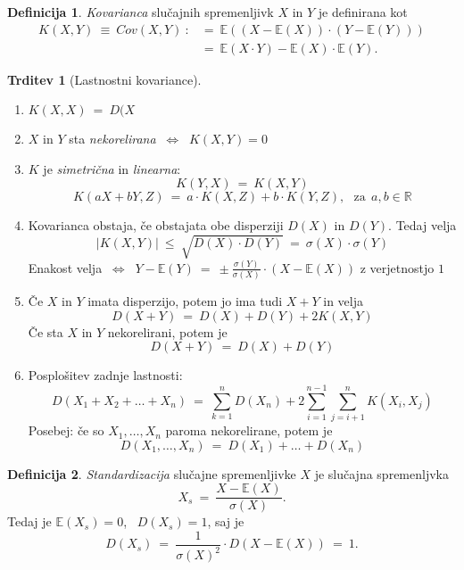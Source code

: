 \documentclass[11pt]{article}
\theoremstyle{definition}
\newtheorem{definicija}{Definicija}[section]
\theoremstyle{definition}
\newtheorem{trditev}{Trditev}[section]
\theoremstyle{definition}
\begin{document}
\vspace{0.5cm}

\begin{definicija}

\textit{Kovarianca} slučajnih spremenljivk $X$ in $Y$ je definirana kot 
\begin{align*}
K(X, Y) ~\equiv~ Cov(X, Y) ~:&=~ \mathbb{E}((X - \mathbb{E}(X)) \cdot (Y - \mathbb{E}(Y))) \\
&=~ \mathbb{E}(X \cdot Y) - \mathbb{E}(X) \cdot \mathbb{E}(Y).
\end{align*}


\end{definicija}
\vspace{0.5cm}

\begin{trditev}[Lastnostni kovariance]
~\\
\begin{enumerate}
	\item $K(X,X) ~=~ D(X$
	\item $X$ in $Y$ sta \textit{nekorelirana} $~\Leftrightarrow~$ $K(X, Y) = 0$
	\item $K$ je \textit{simetrična} in \textit{linearna}:
	$$K(Y, X) ~=~ K(X, Y)$$
	$$K(aX + bY, Z) ~=~ a \cdot K(X, Z) + b \cdot K(Y, Z), ~~~\text{za}~~ a, b \in \mathbb{R}$$
	\item Kovarianca obstaja, če obstajata obe disperziji $D(X)$ in $D(Y)$. Tedaj velja
	$$|K(X,Y)| ~\leq~ \sqrt{D(X) \cdot D(Y)} ~=~ \sigma(X) \cdot \sigma(Y)$$
	Enakost velja $~\Leftrightarrow~$ $Y - \mathbb{E}(Y) ~=~ \pm \frac{\sigma(Y)}{\sigma(X)} \cdot (X - \mathbb{E}(X))$ z verjetnostjo $1$
	\item Če $X$ in $Y$ imata disperzijo, potem jo ima tudi $X+Y$ in velja
	$$D(X+Y) ~=~ D(X) + D(Y) + 2K(X,Y)$$
	Če sta $X$ in $Y$ nekorelirani, potem je
	$$D(X+Y) ~=~ D(X) + D(Y)$$
	\item Posplošitev  zadnje lastnosti:
	$$D(X_1 + X_2 + \ldots + X_n) ~=~ \sum_{k=1}^n D(X_n) + 2\sum_{i=1}^{n-1} \sum_{j=i+1}^n K(X_i, X_j)$$
	Posebej: če so $X_1, \ldots, X_n$ paroma nekorelirane, potem je 
	$$D(X_1, \ldots, X_n) ~=~ D(X_1) + \ldots + D(X_n)$$
\end{enumerate}
\end{trditev}
\vspace{0.5cm}

\begin{definicija}

\textit{Standardizacija} slučajne spremenljivke $X$ je slučajna spremenljvka
$$X_s ~=~ \frac{X - \mathbb{E}(X)}{\sigma(X)}.$$
Tedaj je $\mathbb{E}(X_s) = 0$, ~$D(X_s) = 1$, saj je
$$D(X_s) ~=~ \frac{1}{\sigma(X)^2} \cdot D(X - \mathbb{E}(X)) ~=~ 1.$$

\end{definicija}
\vspace{0.5cm}
\end{document}
